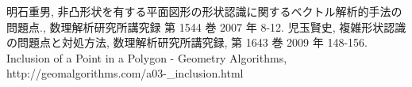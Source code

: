 \begin{thebibliography}{9}

明石重男, 非凸形状を有する平面図形の形状認識に関するベクトル解析的手法の問題点., 数理解析研究所講究録 第 1544 巻 2007 年 8-12.
児玉賢史, 複雑形状認識の問題点と対処方法, 数理解析研究所講究録, 第 1643 巻 2009 年 148-156.
Inclusion of a Point in a Polygon - Geometry Algorithms,
http://geomalgorithms.com/a03-\_inclusion.html

\end{thebibliography} 